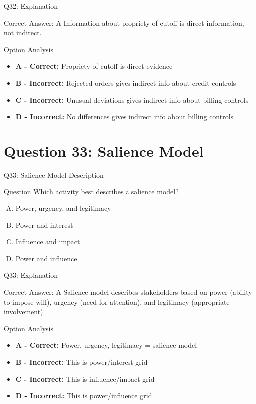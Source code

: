 \documentclass{beamer}
\begin{document}
	\begin{frame}{Q32: Explanation}
		\begin{block}{Correct Answer: A}
			Information about propriety of cutoff is direct information, not indirect.
		\end{block}
		\begin{block}{Option Analysis}
			\begin{itemize}
				\item \textbf{A - Correct:} Propriety of cutoff is direct evidence
				\item \textbf{B - Incorrect:} Rejected orders gives indirect info about credit controls
				\item \textbf{C - Incorrect:} Unusual deviations gives indirect info about billing controls
				\item \textbf{D - Incorrect:} No differences gives indirect info about billing controls
			\end{itemize}
		\end{block}
	\end{frame}
	
	\section{Question 33: Salience Model}
	
	\begin{frame}{Q33: Salience Model Description}
		\begin{block}{Question}
			Which activity best describes a salience model?
		\end{block}
		\begin{enumerate}[(A)]
			\item Power, urgency, and legitimacy
			\item Power and interest
			\item Influence and impact
			\item Power and influence
		\end{enumerate}
	\end{frame}
	
	\begin{frame}{Q33: Explanation}
		\begin{block}{Correct Answer: A}
			Salience model describes stakeholders based on power (ability to impose will), urgency (need for attention), and legitimacy (appropriate involvement).
		\end{block}
		\begin{block}{Option Analysis}
			\begin{itemize}
				\item \textbf{A - Correct:} Power, urgency, legitimacy = salience model
				\item \textbf{B - Incorrect:} This is power/interest grid
				\item \textbf{C - Incorrect:} This is influence/impact grid
				\item \textbf{D - Incorrect:} This is power/influence grid
			\end{itemize}
		\end{block}
	\end{frame}
	
\end{document}
